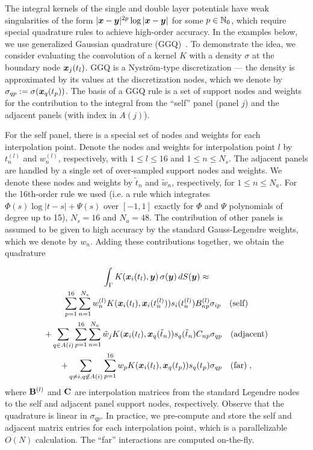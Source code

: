 The integral kernels of the single and
double layer potentials have weak
singularities of the form $|{\boldsymbol x}-{\boldsymbol y}|^{2p}\log |{\boldsymbol x}-{\boldsymbol y}|$
for some $p \in \mathbb{N}_0$, which require special
quadrature rules to achieve high-order accuracy.
%
In the examples below, we use generalized
Gaussian quadrature (GGQ)~\cite{bremer2010}.
%
To demonstrate the idea, we consider
evaluating the convolution of a kernel
$K$ with a density $\sigma$
at the boundary node ${\boldsymbol x}_j(t_l)$.
%
GGQ is a Nystr\"{o}m-type discretization ---
the density is approximated 
by its values at the discretization nodes,
which we denote by
$\sigma_{qp} := \sigma({\boldsymbol x}_q(t_p))$.
%
The basis of a GGQ rule is a set of 
support nodes and weights for the
contribution to the integral from the
``self'' panel (panel $j$) and the adjacent
panels (with index in $A(j)$).
%

For the self panel, there is a special set
of nodes and weights for each interpolation
point. Denote the nodes and weights
for interpolation point $l$ by $t^{(l)}_{n}$
and $w^{(l)}_{n}$, respectively, with
$1\leq l \leq 16$ and $1\leq n \leq N_s$.
%
The adjacent panels are handled by a single
set of over-sampled support nodes and weights.
We denote these nodes and weights
by $\tilde{t}_n$ and $\tilde{w}_n$, respectively,
for $1 \leq n \leq N_a$.
%
For the {\color{red} 16th-order} rule we used
{\color{red} (i.e. a rule which integrates
  $\Phi(s)\log|t-s| + \Psi(s)$ over $[-1,1]$ exactly
  for $\Phi$ and $\Psi$ polynomials of degree up
  to 15)}, $N_s = 16$ and
  $N_a = 48$. 
%
The contribution of other panels is assumed
to be given to high accuracy by the standard
Gauss-Legendre weights, which we denote
by $w_n$.
%
Adding these contributions together, we obtain the
quadrature

\begin{multline}
  \int_\Gamma K({\boldsymbol x}_i(t_l),{\boldsymbol y}) \, \sigma({\boldsymbol y})
  \, dS({\boldsymbol y}) \approx \\
  \sum_{p=1}^{16} \sum_{n=1}^{N_s}
  w^{(l)}_{n} K({\boldsymbol x}_i(t_l),{\boldsymbol x}_i({t}^{(l)}_{n}))
  s_i({t}^{(l)}_{n}) B^{(l)}_{np} \sigma_{ip} \quad \textrm{(self)}
  \\
  + \sum_{q\in A(i)} \sum_{p=1}^{16} \sum_{n=1}^{N_a}
  \tilde{w}_jK({\boldsymbol x}_i(t_l),{\boldsymbol x}_q(\tilde{t}_n)) s_q(\tilde{t}_n)
  C_{np} \sigma_{qp}
  \quad \textrm{(adjacent)} \\
  + \sum_{q\neq i, q\not\in A(i)} \sum_{p=1}^{16}
  w_p K({\boldsymbol x}_i(t_l),{\boldsymbol x}_q(t_p)) s_q(t_p)
  \sigma_{qp} \quad \textrm{(far)} \nonumber \; ,
\end{multline}
where ${\bf B}^{(l)}$ and ${\bf C}$ are interpolation
matrices from the standard Legendre nodes
to the self and adjacent panel support nodes,
respectively. Observe that the quadrature is
linear in $\sigma_{qp}$. In practice, we pre-compute
and store the self and adjacent matrix entries for each
interpolation point, which is a parallelizable
$O(N)$ calculation. The ``far'' interactions
are computed on-the-fly.

